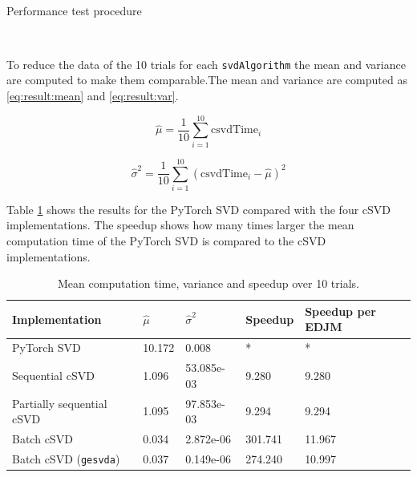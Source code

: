 $ $ \newline

\begin{algorithm}[H]
\label{alg:result:performance}
\caption{Performance test procedure}
\end{algorithm}

$ $ \newline

To reduce the data of the 10 trials for each \texttt{svdAlgorithm} the mean and variance are computed to make them comparable.The mean and variance are computed as \eqref{eq:result:mean} and \eqref{eq:result:var}.

\begin{equation}
  \label{eq:result:mean}
  \hat \mu = \frac{1}{10} \sum_{i=1}^{10} \mathrm{csvdTime}_i 
\end{equation}

\begin{equation}
  \label{eq:result:var}
  \hat \sigma^2 = \frac{1}{10} \sum_{i=1}^{10} \left ( \mathrm{csvdTime}_i - \hat \mu \right )^2
\end{equation}

Table \ref{tab:csvd:performance} shows the results for the PyTorch SVD compared with the four cSVD implementations. The speedup shows how many times larger the mean computation time of the PyTorch SVD is compared to the cSVD implementations.

\begin{table}[H]
  \centering
    \begin{tabular}{|l|l|l|l|l|} \hline
      Implementation & $\hat \mu$ & $\hat \sigma^2$ & Speedup & Speedup per EDJM \\ \hline
      PyTorch SVD & 10.172 & 0.008 & * & * \\ \hline
      Sequential cSVD & 1.096  & 53.085e-03 & 9.280 & 9.280 \\ \hline
      Partially sequential cSVD & 1.095 & 97.853e-03 & 9.294 & 9.294 \\ \hline
      Batch cSVD & 0.034 & 2.872e-06 & 301.741 & 11.967 \\ \hline
      Batch cSVD (\texttt{gesvda}) & 0.037  & 0.149e-06 & 274.240 & 10.997 \\ \hline
    \end{tabular}
    \caption{Mean computation time, variance and speedup over 10 trials.}
    \label{tab:csvd:performance}
  \end{table}

